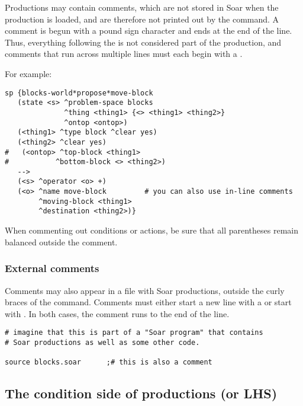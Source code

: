 Productions may contain comments, which are not stored in Soar when the
production is loaded, and are therefore not printed out by the
 command. A comment is begun with a pound sign character
\soar{\#} and ends at the end of the line.  Thus, everything following
the \soar{\#} is not considered part of the production, and comments
that run across multiple lines must each begin with a \soar{\#}.

For example:
\begin{verbatim}
sp {blocks-world*propose*move-block
   (state <s> ^problem-space blocks
              ^thing <thing1> {<> <thing1> <thing2>}
              ^ontop <ontop>)
   (<thing1> ^type block ^clear yes)
   (<thing2> ^clear yes)
#   (<ontop> ^top-block <thing1>
#           ^bottom-block <> <thing2>)
   -->
   (<s> ^operator <o> +)
   (<o> ^name move-block         # you can also use in-line comments
        ^moving-block <thing1>
        ^destination <thing2>)}
\end{verbatim}

When commenting out conditions or actions, be sure that all parentheses
remain balanced outside the comment.

\subsubsection*{External comments}

Comments may also appear in a file with Soar productions, outside
 the curly braces of the  command.  Comments
must either start a new line with a \soar{\#} or start with \soar{;\#}.
In both cases, the comment runs to the end of the line.

\begin{verbatim}
# imagine that this is part of a "Soar program" that contains 
# Soar productions as well as some other code.

source blocks.soar      ;# this is also a comment
\end{verbatim}


\subsection{The condition side of productions (or LHS)}
\label{SYNTAX-pm-conditions}            %

